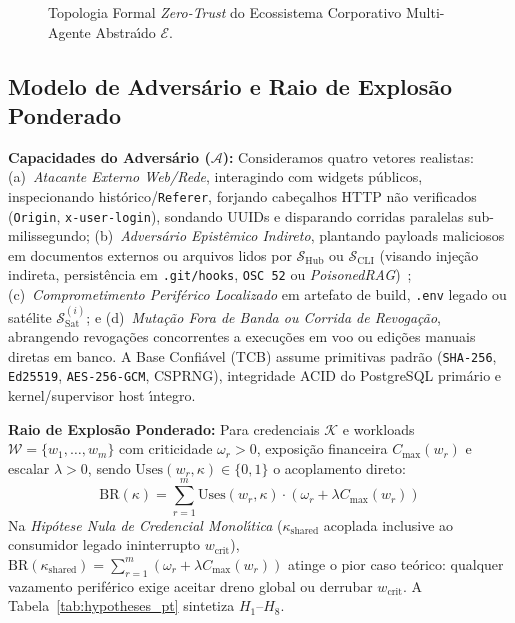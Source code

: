 \documentclass[10pt,twocolumn]{article}
\begin{document}
\begin{figure}[t]
\caption{Topologia Formal \emph{Zero-Trust} do Ecossistema Corporativo Multi-Agente Abstra\'{\i}do $\mathcal{E}$.}
\label{fig:topology_pt}
\end{figure}

\subsection{Modelo de Advers\'{a}rio e Raio de Explos\~{a}o Ponderado}

\textbf{Capacidades do Advers\'{a}rio ($\mathcal{A}$):} Consideramos quatro vetores realistas: (a)~\emph{Atacante Externo Web/Rede}, interagindo com widgets p\'{u}blicos, inspecionando hist\'{o}rico/\texttt{Referer}, forjando cabe\c{c}alhos HTTP n\~{a}o verificados (\texttt{Origin}, \texttt{x-user-login}), sondando UUIDs e disparando corridas paralelas sub-milissegundo; (b)~\emph{Advers\'{a}rio Epist\^{e}mico Indireto}, plantando payloads maliciosos em documentos externos ou arquivos lidos por $\mathcal{S}_{\mathrm{Hub}}$ ou $\mathcal{S}_{\mathrm{CLI}}$ (visando inje\c{c}\~{a}o indireta, persist\^{e}ncia em \texttt{.git/hooks}, \texttt{OSC 52} ou \emph{PoisonedRAG})~\cite{R22,R26}; (c)~\emph{Comprometimento Perif\'{e}rico Localizado} em artefato de build, \texttt{.env} legado ou sat\'{e}lite $\mathcal{S}_{\mathrm{Sat}}^{(i)}$; e (d)~\emph{Muta\c{c}\~{a}o Fora de Banda ou Corrida de Revoga\c{c}\~{a}o}, abrangendo revoga\c{c}\~{o}es concorrentes a execu\c{c}\~{o}es em voo ou edi\c{c}\~{o}es manuais diretas em banco. A Base Confi\'{a}vel (TCB) assume primitivas padr\~{a}o (\texttt{SHA-256}, \texttt{Ed25519}, \texttt{AES-256-GCM}, CSPRNG), integridade ACID do PostgreSQL prim\'{a}rio e kernel/supervisor host \'{\i}ntegro.

\textbf{Raio de Explos\~{a}o Ponderado:} Para credenciais $\mathcal{K}$ e workloads $\mathcal{W} = \{w_1, \dots, w_m\}$ com criticidade $\omega_r > 0$, exposi\c{c}\~{a}o financeira $C_{\max}(w_r)$ e escalar $\lambda > 0$, sendo $\mathrm{Uses}(w_r, \kappa) \in \{0, 1\}$ o acoplamento direto:
\begin{equation}
\mathrm{BR}(\kappa) = \sum_{r=1}^{m} \mathrm{Uses}(w_r, \kappa) \cdot \left(\omega_r + \lambda C_{\max}(w_r)\right)
\end{equation}
Na \emph{Hip\'{o}tese Nula de Credencial Monol\'{\i}tica} ($\kappa_{\mathrm{shared}}$ acoplada inclusive ao consumidor legado ininterrupto $w_{\mathrm{crit}}$), $\mathrm{BR}(\kappa_{\mathrm{shared}}) = \sum_{r=1}^{m} (\omega_r + \lambda C_{\max}(w_r))$ atinge o pior caso te\'{o}rico: qualquer vazamento perif\'{e}rico exige aceitar dreno global ou derrubar $w_{\mathrm{crit}}$. A Tabela~\ref{tab:hypotheses_pt} sintetiza $H_1$--$H_8$.
\end{document}
